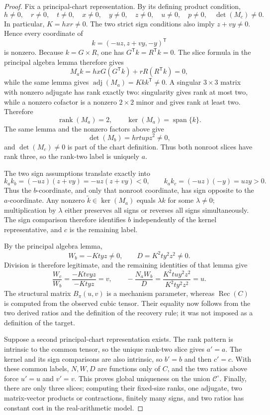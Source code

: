 \documentclass{article}
\begin{document}
\begin{proof}
Fix a principal-chart representation.  By its defining product condition,
\[
h\ne0,\quad r\ne0,\quad t\ne0,\quad x\ne0,\quad y\ne0,\quad z\ne0,\quad u\ne0,\quad p\ne0,
\quad \det(M_c)\ne0.
\]
In particular, \(K=hxr\ne0\).  The two strict sign conditions also imply \(z+vy\ne0\).  Hence every coordinate of
\[
k=(-uz,z+vy,-y)^{\mathsf T}
\]
is nonzero.  Because \(k=G\times R\), one has \(G^{\mathsf T}k=R^{\mathsf T}k=0\).  The slice formula in the principal algebra lemma therefore gives
\[
M_ak=hxG(G^{\mathsf T}k)+rR(R^{\mathsf T}k)=0,
\]
while the same lemma gives \(\operatorname{adj}(M_a)=Kkk^{\mathsf T}\ne0\).  A singular \(3\times3\) matrix with nonzero adjugate has rank exactly two: singularity gives rank at most two, while a nonzero cofactor is a nonzero \(2\times2\) minor and gives rank at least two.  Therefore
\[
\operatorname{rank}(M_a)=2,
\qquad
\ker(M_a)=\operatorname{span}\{k\}.
\]
The same lemma and the nonzero factors above give
\[
\det(M_b)=hrtupz^2\ne0,
\]
and \(\det(M_c)\ne0\) is part of the chart definition.  Thus both nonroot slices have rank three, so the rank-two label is uniquely \(a\).

The two sign assumptions translate exactly into
\[
k_ak_b=(-uz)(z+vy)=-uz(z+vy)<0,
\qquad
k_ak_c=(-uz)(-y)=uzy>0.
\]
Thus the \(b\)-coordinate, and only that nonroot coordinate, has sign opposite to the \(a\)-coordinate.  Any nonzero \(\widetilde k\in\ker(M_a)\) equals \(\lambda k\) for some \(\lambda\ne0\); multiplication by \(\lambda\) either preserves all signs or reverses all signs simultaneously.  The sign comparison therefore identifies \(b\) independently of the kernel representative, and \(c\) is the remaining label.

By the principal algebra lemma,
\[
W_b=-Ktyz\ne0,
\qquad
D=K^2ty^2z^2\ne0.
\]
Division is therefore legitimate, and the remaining identities of that lemma give
\[
\frac{W_c}{W_b}
=\frac{-Ktvyz}{-Ktyz}=v,
\qquad
-\frac{N_aW_b}{D}
=\frac{K^2tuy^2z^2}{K^2ty^2z^2}=u.
\]
The structural matrix \(B_{\pi}(u,v)\) is a mechanism parameter, whereas \(\operatorname{Rec}(C)\) is computed from the observed cubic tensor.  Their equality now follows from the two derived ratios and the definition of the recovery rule; it was not imposed as a definition of the target.

Suppose a second principal-chart representation exists.  The rank pattern is intrinsic to the common tensor, so the unique rank-two slice gives \(a'=a\).  The kernel and its sign comparisons are also intrinsic, so \(b'=b\) and then \(c'=c\).  With these common labels, \(N,W,D\) are functions only of \(C\), and the two ratios above force \(u'=u\) and \(v'=v\).  This proves global uniqueness on the union \(\mathcal C^{\circ}\).  Finally, there are only three slices; computing their fixed-size ranks, one adjugate, two matrix-vector products or contractions, finitely many signs, and two ratios has constant cost in the real-arithmetic model.
\end{proof}
\end{document}
